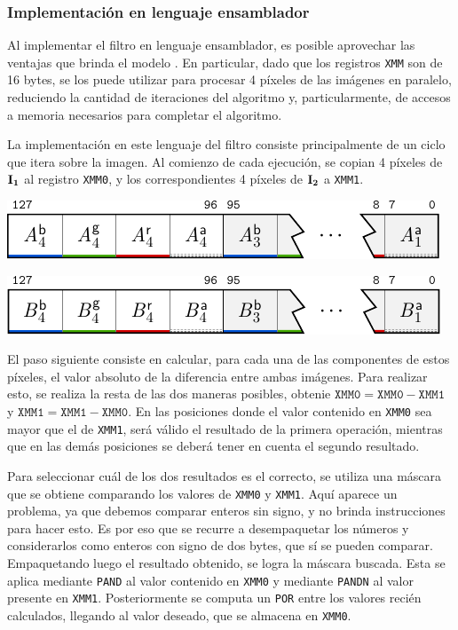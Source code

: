     \subsubsection{Implementación en lenguaje ensamblador}
      Al implementar el filtro en lenguaje ensamblador, es posible aprovechar las ventajas que brinda el modelo . En particular, dado que los registros \texttt{XMM} son de 16 bytes, se los puede utilizar para procesar 4 píxeles de las imágenes en paralelo, reduciendo la cantidad de iteraciones del algoritmo y, particularmente, de accesos a memoria necesarios para completar el algoritmo.

      La implementación en este lenguaje del filtro consiste principalmente de un ciclo que itera sobre la imagen. Al comienzo de cada ejecución, se copian 4 píxeles de $\mathbf{I_1}$ al registro \texttt{XMM0}, y los correspondientes 4 píxeles de $\mathbf{I_2}$ a \texttt{XMM1}.

      \begin{center}
         \includegraphics{imagenes/diff-registros-1.pdf}

         \includegraphics{imagenes/diff-registros-2.pdf}
      \end{center}

      El paso siguiente consiste en calcular, para cada una de las componentes de estos píxeles, el valor absoluto de la diferencia entre ambas imágenes. Para realizar esto, se realiza la resta de las dos maneras posibles, obtenie $\mathtt{XMM0} = \mathtt{XMM0} - \mathtt{XMM1}$ y $\mathtt{XMM1} = \mathtt{XMM1} - \mathtt{XMM0}$. En las posiciones donde el valor contenido en \texttt{XMM0} sea mayor que el de \texttt{XMM1}, será válido el resultado de la primera operación, mientras que en las demás posiciones se deberá tener en cuenta el segundo resultado.

      Para seleccionar cuál de los dos resultados es el correcto, se utiliza una máscara que se obtiene comparando los valores de \texttt{XMM0} y \texttt{XMM1}. Aquí aparece un problema, ya que debemos comparar enteros sin signo, y  no brinda instrucciones para hacer esto. Es por eso que se recurre a desempaquetar los números y considerarlos como enteros con signo de dos bytes, que sí se pueden comparar. Empaquetando luego el resultado obtenido, se logra la máscara buscada. Esta se aplica mediante \texttt{PAND} al valor contenido en \texttt{XMM0} y mediante \texttt{PANDN} al valor presente en \texttt{XMM1}. Posteriormente se computa un \texttt{POR} entre los valores recién calculados, llegando al valor deseado, que se almacena en \texttt{XMM0}.

